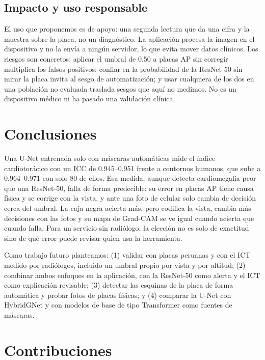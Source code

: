 \documentclass[conference]{IEEEtran}
\begin{document}
\subsection{Impacto y uso responsable}

El uso que proponemos es de apoyo: una segunda lectura que da una cifra y la muestra sobre la placa, no un
diagnóstico. La aplicación procesa la imagen en el dispositivo y no la envía a ningún servidor, lo que evita mover
datos clínicos. Los riesgos son concretos: aplicar el umbral de 0.50 a placas AP sin corregir multiplica los falsos
positivos; confiar en la probabilidad de la ResNet-50 sin mirar la placa invita al sesgo de automatización; y usar
cualquiera de los dos en una población no evaluada traslada sesgos que aquí no medimos. No es un dispositivo médico
ni ha pasado una validación clínica.

\section{Conclusiones}\label{sec:con}

Una U-Net entrenada solo con máscaras automáticas mide el índice cardiotorácico con un ICC de 0.945--0.951 frente a
contornos humanos, que sube a 0.964--0.971 con solo 80 de ellos. Esa medida, aunque detecta cardiomegalia peor que una
ResNet-50, falla de forma predecible: su error en placas AP tiene causa física y se corrige con la vista, y ante una
foto de celular solo cambia de decisión cerca del umbral. La caja negra acierta más, pero codifica la vista, cambia
más decisiones con las fotos y su mapa de Grad-CAM se ve igual cuando acierta que cuando falla. Para un servicio sin
radiólogo, la elección no es solo de exactitud sino de qué error puede revisar quien usa la herramienta.

Como trabajo futuro planteamos: (1) validar con placas peruanas y con el ICT medido por radiólogos, incluido un
umbral propio por vista y por altitud; (2) combinar ambos enfoques en la aplicación, con la ResNet-50 como alerta y el
ICT como explicación revisable; (3) detectar las esquinas de la placa de forma automática y probar fotos de placas
físicas; y (4) comparar la U-Net con HybridGNet y con modelos de base de tipo Transformer como fuentes de máscaras.

\section*{Contribuciones}
\end{document}
